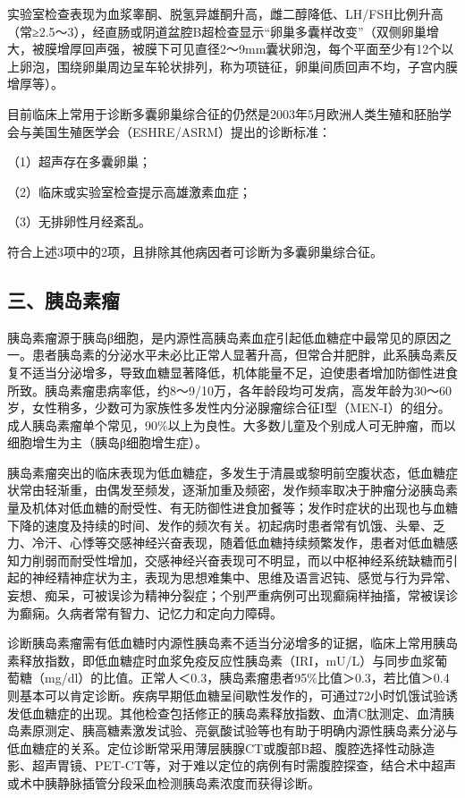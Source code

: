 实验室检查表现为血浆睾酮、脱氢异雄酮升高，雌二醇降低、LH/FSH比例升高（常≥2.5～3），经直肠或阴道盆腔B超检查显示“卵巢多囊样改变”（双侧卵巢增大，被膜增厚回声强，被膜下可见直径2～9mm囊状卵泡，每个平面至少有12个以上卵泡，围绕卵巢周边呈车轮状排列，称为项链征，卵巢间质回声不均，子宫内膜增厚等）。

目前临床上常用于诊断多囊卵巢综合征的仍然是2003年5月欧洲人类生殖和胚胎学会与美国生殖医学会（ESHRE/ASRM）提出的诊断标准：

（1）超声存在多囊卵巢；

（2）临床或实验室检查提示高雄激素血症；

（3）无排卵性月经紊乱。

符合上述3项中的2项，且排除其他病因者可诊断为多囊卵巢综合征。

\subsection{三、胰岛素瘤}

胰岛素瘤源于胰岛β细胞，是内源性高胰岛素血症引起低血糖症中最常见的原因之一。患者胰岛素的分泌水平未必比正常人显著升高，但常合并肥胖，此系胰岛素反复不适当分泌增多，导致血糖显著降低，机体能量不足，迫使患者增加防御性进食所致。胰岛素瘤患病率低，约8～9/10万，各年龄段均可发病，高发年龄为30～60岁，女性稍多，少数可为家族性多发性内分泌腺瘤综合征I型（MEN-I）的组分。成人胰岛素瘤单个常见，90\%以上为良性。大多数儿童及个别成人可无肿瘤，而以细胞增生为主（胰岛β细胞增生症）。

胰岛素瘤突出的临床表现为低血糖症，多发生于清晨或黎明前空腹状态，低血糖症状常由轻渐重，由偶发至频发，逐渐加重及频密，发作频率取决于肿瘤分泌胰岛素量及机体对低血糖的耐受性、有无防御性进食加餐等；发作时症状的出现也与血糖下降的速度及持续的时间、发作的频次有关。初起病时患者常有饥饿、头晕、乏力、冷汗、心悸等交感神经兴奋表现，随着低血糖持续频繁发作，患者对低血糖感知力削弱而耐受性增加，交感神经兴奋表现可不明显，而以中枢神经系统缺糖而引起的神经精神症状为主，表现为思想难集中、思维及语言迟钝、感觉与行为异常、妄想、痴呆，可被误诊为精神分裂症；个别严重病例可出现癫痫样抽搐，常被误诊为癫痫。久病者常有智力、记忆力和定向力障碍。

诊断胰岛素瘤需有低血糖时内源性胰岛素不适当分泌增多的证据，临床上常用胰岛素释放指数，即低血糖症时血浆免疫反应性胰岛素（IRI，mU/L）与同步血浆葡萄糖（mg/dl）的比值。正常人＜0.3，胰岛素瘤患者95\%比值＞0.3，若比值＞0.4则基本可以肯定诊断。疾病早期低血糖呈间歇性发作的，可通过72小时饥饿试验诱发低血糖症的出现。其他检查包括修正的胰岛素释放指数、血清C肽测定、血清胰岛素原测定、胰高糖素激发试验、亮氨酸试验等也有助于明确内源性胰岛素分泌与低血糖症的关系。定位诊断常采用薄层胰腺CT或腹部B超、腹腔选择性动脉造影、超声胃镜、PET-CT等，对于难以定位的病例有时需腹腔探查，结合术中超声或术中胰静脉插管分段采血检测胰岛素浓度而获得诊断。

